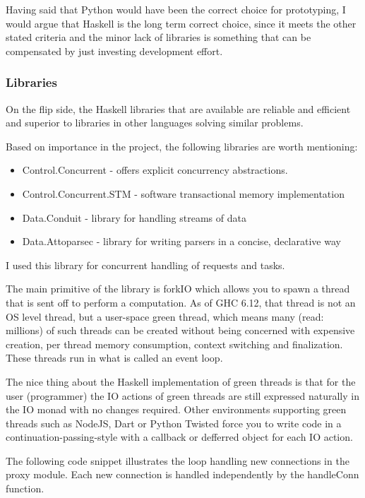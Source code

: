\documentclass[11pt]{article} %
\begin{document}
Having said that Python would have been the correct choice for prototyping, I would argue that Haskell is the long term correct choice, since it meets the other stated criteria and the minor lack of libraries is something that can be compensated by just investing development effort.

\subsubsection{Libraries}

On the flip side, the Haskell libraries that are available are reliable and efficient and superior to libraries in other languages solving similar problems.

Based on importance in the project, the following libraries are worth mentioning:

\begin{itemize}
\item  Control.Concurrent - offers explicit concurrency abstractions. 
\item Control.Concurrent.STM - software transactional memory implementation
\item Data.Conduit -  library for handling streams of data
\item Data.Attoparsec - library for writing parsers in a concise, declarative way
\end{itemize}


I used this library for concurrent handling of requests and tasks.

The main primitive of the library is forkIO which allows you to spawn a thread that is sent off to perform a computation. As of GHC 6.12, that thread is not an OS level thread, but a user-space green thread, which means many (read: millions) of such threads can be created without being concerned with expensive creation, per thread memory consumption, context switching and finalization. These threads run in what is called an event loop.

The nice thing about the Haskell implementation of green threads is that for the user (programmer) the IO actions of green threads are still expressed naturally in the IO monad with no changes required. Other environments supporting green threads such as NodeJS, Dart or Python Twisted force you to write code in a continuation-passing-style with a callback or defferred object for each IO action. 

The following code snippet illustrates the loop handling new connections in the proxy module. Each new connection is handled independently by the handleConn function.
\end{document}
